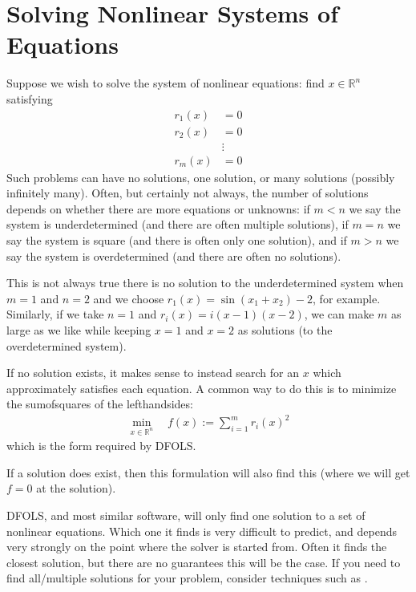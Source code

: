 \documentclass[letterpaper,10pt,english]{sphinxmanual}
\begin{document}
\section{Solving Nonlinear Systems of Equations}
\label{\detokenize{info:solving-nonlinear-systems-of-equations}}
Suppose we wish to solve the system of nonlinear equations: find \(x\in\mathbb{R}^n\) satisfying
\begin{equation*}
\begin{split}r_1(x) &= 0 \\
r_2(x) &= 0 \\
&\vdots \\
r_m(x) &= 0\end{split}
\end{equation*}
Such problems can have no solutions, one solution, or many solutions (possibly infinitely many). Often, but certainly not always, the number of solutions depends on whether there are more equations or unknowns: if \(m<n\) we say the system is underdetermined (and there are often multiple solutions), if \(m=n\) we say the system is square (and there is often only one solution), and if \(m>n\) we say the system is overdetermined (and there are often no solutions).

This is not always true \textendash{} there is no solution to the underdetermined system when \(m=1\) and \(n=2\) and we choose \(r_1(x)=\sin(x_1+x_2)-2\), for example.
Similarly, if we take \(n=1\) and \(r_i(x)=i (x-1)(x-2)\), we can make \(m\) as large as we like while keeping \(x=1\) and \(x=2\) as solutions (to the overdetermined system).

If no solution exists, it makes sense to instead search for an \(x\) which approximately satisfies each equation. A common way to do this is to minimize the sum\sphinxhyphen{}of\sphinxhyphen{}squares of the left\sphinxhyphen{}hand\sphinxhyphen{}sides:
\begin{equation*}
\begin{split}\min_{x\in\mathbb{R}^n}  \quad  f(x) := \sum_{i=1}^{m}r_i(x)^2\end{split}
\end{equation*}
which is the form required by DFO\sphinxhyphen{}LS.

If a solution does exist, then this formulation will also find this (where we will get \(f=0\) at the solution).

 DFO\sphinxhyphen{}LS, and most similar software, will only find one solution to a set of nonlinear equations. Which one it finds is very difficult to predict, and depends very strongly on the point where the solver is started from. Often it finds the closest solution, but there are no guarantees this will be the case. If you need to find all/multiple solutions for your problem, consider techniques such as .
\end{document}
